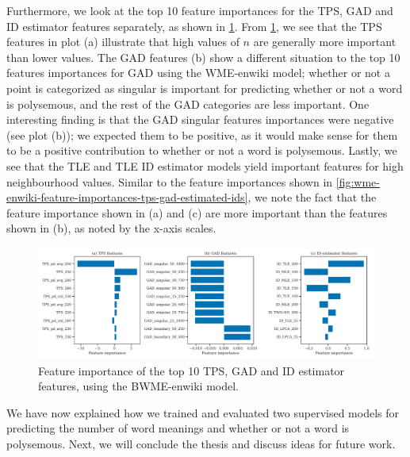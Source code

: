 Furthermore, we look at the top 10 feature importances for the TPS, GAD and ID estimator features separately, as shown in \cref{fig:bwme-enwiki-feature-importances-tps-gad-estimated-ids}. From \cref{fig:bwme-enwiki-feature-importances-tps-gad-estimated-ids}, we see that the TPS features in plot (a) illustrate that high values of $n$ are generally more important than lower values. The GAD features (b) show a different situation to the top 10 features importances for GAD using the WME-enwiki model; whether or not a point is categorized as singular is important for predicting whether or not a word is polysemous, and the rest of the GAD categories are less important. One interesting finding is that the GAD singular features importances were negative (see plot (b)); we expected them to be positive, as it would make sense for them to be a positive contribution to whether or not a word is polysemous. Lastly, we see that the TLE and TLE ID estimator models yield important features for high neighbourhood values. Similar to the feature importances shown in \cref{fig:wme-enwiki-feature-importances-tps-gad-estimated-ids}, we note the fact that the feature importance shown in (a) and (c) are more important than the features shown in (b), as noted by the x-axis scales.
\begin{figure}[H]
    \centering
    \includegraphics[width=\textwidth]{thesis/figures/bwme-enwiki-top-10-feature-importances-tps-gad-estimated-ids.pdf}
    \caption{Feature importance of the top 10 TPS, GAD and ID estimator features, using the BWME-enwiki model.}
    \label{fig:bwme-enwiki-feature-importances-tps-gad-estimated-ids}
\end{figure}

We have now explained how we trained and evaluated two supervised models for predicting the number of word meanings and whether or not a word is polysemous. Next, we will conclude the thesis and discuss ideas for future work.